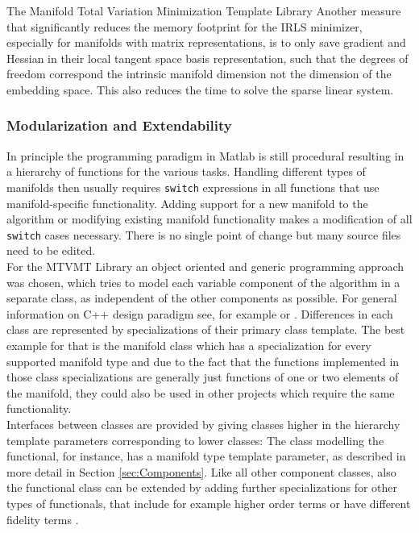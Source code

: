\begin{chapter}{The Manifold Total Variation Minimization Template Library}
Another measure that significantly reduces the memory footprint for the IRLS minimizer, especially for manifolds with matrix representations, is to only save gradient and Hessian
in their local tangent space basis representation, such that the degrees of freedom correspond the intrinsic manifold dimension not the dimension of the embedding space. This also reduces
the time to solve the sparse linear system.\\

\subsubsection{Modularization and Extendability} %
\label{ssub:Modularization}
In principle the programming paradigm in Matlab is still procedural resulting in a hierarchy of functions for the various tasks. Handling different types of manifolds
then usually requires \texttt{switch} expressions in all functions that use manifold-specific functionality. Adding support for a new manifold to the algorithm or modifying
existing manifold functionality makes a modification of all \texttt{switch} cases necessary. There is no single point of change but many source files need to be edited.\\

For the MTVMT Library an object oriented and generic programming approach was chosen, which tries to model each variable component of the algorithm in a separate class, as 
independent of the other components as possible. For general information on C++ design paradigm see, for example \cite{CPPTemplateMP} or \cite{CPPGeneric}.
Differences in each class are represented by specializations of their primary class template. The best example for that is the
manifold class which has a specialization for every supported manifold type and due to the fact that the functions implemented in those class specializations are generally
just functions of one or two elements of the manifold, they could also be used in other projects which require the same functionality.\\

Interfaces between classes are provided by giving classes higher in the hierarchy template parameters corresponding to lower classes: The class modelling the functional, for instance,
has a manifold type template parameter, as described in more detail in Section \ref{sec:Components}. Like all other component classes, also the functional class can be extended
by adding further specializations for other types of functionals, that include for example higher order terms or have different fidelity terms \cite{SceneFlow}.\\


\end{chapter}
